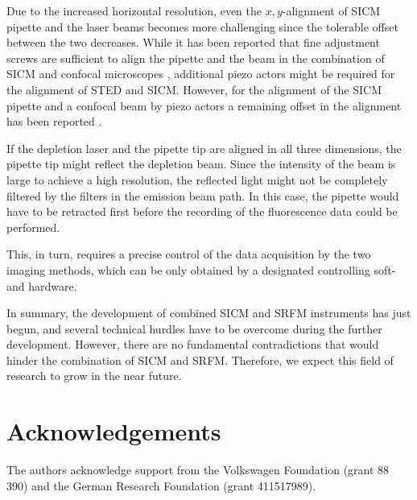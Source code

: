 Due to the increased horizontal resolution, even the $x,y$-alignment of SICM
pipette and the laser beams becomes more challenging since the tolerable
offset between the two decreases. While it has been reported that fine
adjustment screws are sufficient to align the pipette and the beam in the
combination of SICM and confocal microscopes \cite{Gorelik2002a,
  Shevchuk2008,Novak2014}, additional piezo actors might be required for the
alignment of STED and SICM. However, for the alignment of the SICM pipette and a
confocal beam by piezo actors a remaining offset in the alignment has been
reported \cite{Bednarska2020}. 

If the depletion laser and the pipette tip are aligned in all three
dimensions, the pipette tip might reflect the depletion beam. Since the
intensity of the beam is large to achieve a high resolution, the reflected
light might not be completely filtered by the filters in the emission beam
path. In this case, the pipette would have to be retracted first before the
recording of the fluorescence data could be performed.

This, in turn, requires a precise control of the data acquisition by the two
imaging methods, which can be only obtained by a designated controlling soft-
and hardware.

In summary, the development of combined SICM and SRFM instruments has just
begun, and several technical hurdles have to be overcome during the
further development. However, there are no fundamental contradictions that
would hinder the combination of SICM and SRFM. Therefore, we expect this field
of research to grow in the near future.     

\section{Acknowledgements}
The authors acknowledge support from the Volkswagen
Foundation (grant 88 390) and the German Research Foundation (grant
411517989). 

